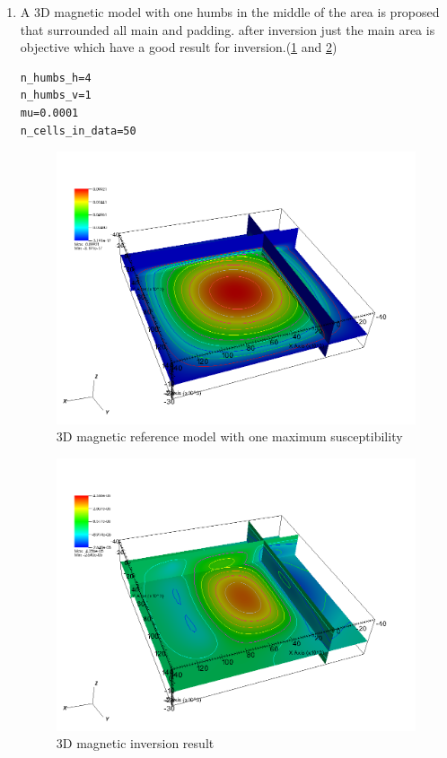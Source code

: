 \begin{enumerate}
\item A 3D magnetic model with one humbs in the middle of the area is proposed that surrounded all main and padding. after inversion just the main area is objective which have a good result for inversion.(\ref{fig:mag3D1-ref} and \ref{fig:mag3D1})

\begin{verbatim}
n_humbs_h=4
n_humbs_v=1
mu=0.0001
n_cells_in_data=50
\end{verbatim}

\begin{figure}
\centering
\includegraphics[width=\textwidth]{mag3D1-ref.png}
\caption{3D magnetic reference model with one maximum susceptibility}
\label{fig:mag3D1-ref}
\end{figure}

\begin{figure}
\centering
\includegraphics[width=\textwidth]{mag3D1.png}
\caption{3D magnetic inversion result}
\label{fig:mag3D1}
\end{figure}
\end{enumerate}
